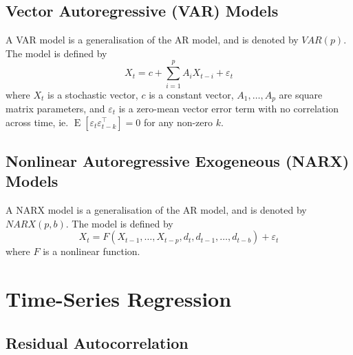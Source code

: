 \documentclass[11pt]{report} %
\begin{document}
\subsection{Vector Autoregressive (VAR) Models}
A VAR model is a generalisation of the AR model, and is denoted by  $VAR\left(p\right)$. The model is defined by
\begin{equation}
X_{t} = c + \sum_{i = 1}^{p}A_{i}X_{t - i} + \varepsilon_{t}
\end{equation}
where $X_{t}$ is a stochastic vector, $c$ is a constant vector, $A_{1}, \dots, A_{p}$ are square matrix parameters, and $\varepsilon_{t}$ is a zero-mean vector error term with no correlation across time, ie. $\operatorname{E}\left[\varepsilon_{t}\varepsilon_{t - k}^{\top}\right] = 0$ for any non-zero $k$.

\subsection{Nonlinear Autoregressive Exogeneous (NARX) Models}
A NARX model is a generalisation of the AR model, and is denoted by $NARX\left(p, b\right)$. The model is defined by
\begin{equation}
X_{t} = F\left(X_{t - 1}, \dots, X_{t - p}, d_{t}, d_{t - 1}, \dots, d_{t - b}\right) + \varepsilon_{t}
\end{equation}
where $F$ is a nonlinear function.

\section{Time-Series Regression}

\subsection{Residual Autocorrelation}
\end{document}

